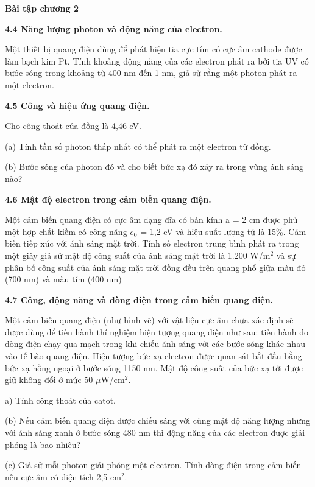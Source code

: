 \documentclass[12pt]{article}
\newcommand{\bt}[1]{\textbf{#1}}
\begin{document}
\begin{center}
{\Large\bfseries Bài tập chương 2}
\end{center}

\bt{4.4 Năng lượng photon và động năng của electron.}

Một thiết bị quang điện dùng để phát hiện tia cực tím có cực âm cathode được làm bạch kim Pt. Tính khoảng động năng của các electron phát ra bởi tia UV có bước sóng trong khoảng từ 400 nm đến 1 nm, giả sử rằng một photon phát ra một electron.

\bt{4.5 Công và hiệu ứng quang điện.}

Cho công thoát của đồng là 4,46 eV.

(a) Tính tần số photon thấp nhất có thể phát ra một electron từ đồng.

(b) Bước sóng của photon đó và cho biết bức xạ đó xảy ra trong vùng ánh sáng nào?

\bt{4.6 Mật độ electron trong cảm biến quang điện.}

Một cảm biến quang điện có cực âm dạng đĩa có bán kính a = 2 cm được phủ một hợp chất kiềm có công năng $e_0$ = 1,2 eV và hiệu suất lượng tử là 15\%. Cảm biến tiếp xúc với ánh sáng mặt trời. Tính số electron trung bình phát ra trong một giây giả sử mật độ công suất của ánh sáng mặt trời là 1.200 W/m$^2$ và sự phân bố công suất của ánh sáng mặt trời đồng đều trên quang phổ giữa màu đỏ (700 nm) và màu tím (400 nm)

\bt{4.7 Công, động năng và dòng điện trong cảm biến quang điện.}

Một cảm biến quang điện (như hình vẽ) với vật liệu cực âm chưa xác định sẽ được dùng để tiến hành thí nghiệm hiện tượng quang điện như sau: tiến hành đo dòng điện chạy qua mạch trong khi chiếu ánh sáng với các bước sóng khác nhau vào tế bào quang điện. Hiện tượng bức xạ electron được quan sát bắt đầu bằng bức xạ hồng ngoại ở bước sóng 1150 nm. Mật độ công suất của bức xạ tới được giữ không đổi ở mức 50 $\mu$W/cm$^2$.

a) Tính công thoát của catot.

(b) Nếu cảm biến quang điện được chiếu sáng với cùng mật độ năng lượng nhưng với ánh sáng xanh ở bước sóng 480 nm thì động năng của các electron được giải phóng là bao nhiêu?

(c) Giả sử mỗi photon giải phóng một electron. Tính dòng điện trong cảm biến nếu cực âm có diện tích 2,5 cm$^2$.
\end{document}
